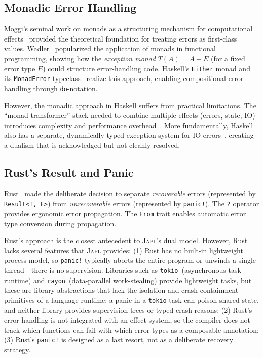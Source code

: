 \documentclass[11pt,twocolumn]{article}
\newcommand{\japl}{\textsc{Japl}}
\begin{document}
\subsection{Monadic Error Handling}

Moggi's seminal work on monads as a structuring mechanism for computational effects~\cite{moggi1991notions} provided the theoretical foundation for treating errors as first-class values. Wadler~\cite{wadler1992essence,wadler1995monads} popularized the application of monads in functional programming, showing how the \emph{exception monad} $T(A) = A + E$ (for a fixed error type $E$) could structure error-handling code. Haskell's \texttt{Either} monad and its \texttt{MonadError} typeclass~\cite{jones1995functional} realize this approach, enabling compositional error handling through \texttt{do}-notation.

However, the monadic approach in Haskell suffers from practical limitations. The ``monad transformer'' stack needed to combine multiple effects (errors, state, IO) introduces complexity and performance overhead~\cite{kiselyov2013extensible}. More fundamentally, Haskell also has a separate, dynamically-typed exception system for IO errors~\cite{marlow2001asynchronous}, creating a dualism that is acknowledged but not cleanly resolved.

\subsection{Rust's Result and Panic}

Rust~\cite{matsakis2014rust,klabnik2019rust} made the deliberate decision to separate \emph{recoverable} errors (represented by \texttt{Result<T, E>}) from \emph{unrecoverable} errors (represented by \texttt{panic!}). The \texttt{?} operator provides ergonomic error propagation. The \texttt{From} trait enables automatic error type conversion during propagation.

Rust's approach is the closest antecedent to \japl{}'s dual model. However, Rust lacks several features that \japl{} provides: (1) Rust has no built-in lightweight process model, so \texttt{panic!} typically aborts the entire program or unwinds a single thread---there is no supervision. Libraries such as \texttt{tokio}~(asynchronous task runtime) and \texttt{rayon}~(data-parallel work-stealing) provide lightweight tasks, but these are library abstractions that lack the isolation and crash-containment primitives of a language runtime: a panic in a \texttt{tokio} task can poison shared state, and neither library provides supervision trees or typed crash reasons; (2) Rust's error handling is not integrated with an effect system, so the compiler does not track which functions can fail with which error types as a composable annotation; (3) Rust's \texttt{panic!} is designed as a last resort, not as a deliberate recovery strategy.
\end{document}
